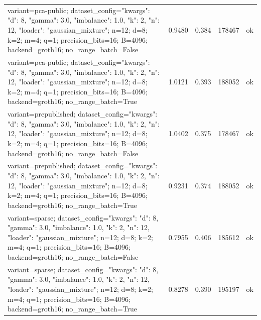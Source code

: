 \begin{tabular}{lcccc}
variant=pca-public; dataset\_config={"kwargs": {"d": 8, "gamma": 3.0, "imbalance": 1.0, "k": 2, "n": 12}, "loader": "gaussian\_mixture"}; n=12; d=8; k=2; m=4; q=1; precision\_bits=16; B=4096; backend=groth16; no\_range\_batch=False & 0.9480 & 0.384 & 178467 & ok \\
variant=pca-public; dataset\_config={"kwargs": {"d": 8, "gamma": 3.0, "imbalance": 1.0, "k": 2, "n": 12}, "loader": "gaussian\_mixture"}; n=12; d=8; k=2; m=4; q=1; precision\_bits=16; B=4096; backend=groth16; no\_range\_batch=True & 1.0121 & 0.393 & 188052 & ok \\
variant=prepublished; dataset\_config={"kwargs": {"d": 8, "gamma": 3.0, "imbalance": 1.0, "k": 2, "n": 12}, "loader": "gaussian\_mixture"}; n=12; d=8; k=2; m=4; q=1; precision\_bits=16; B=4096; backend=groth16; no\_range\_batch=False & 1.0402 & 0.375 & 178467 & ok \\
variant=prepublished; dataset\_config={"kwargs": {"d": 8, "gamma": 3.0, "imbalance": 1.0, "k": 2, "n": 12}, "loader": "gaussian\_mixture"}; n=12; d=8; k=2; m=4; q=1; precision\_bits=16; B=4096; backend=groth16; no\_range\_batch=True & 0.9231 & 0.374 & 188052 & ok \\
variant=sparse; dataset\_config={"kwargs": {"d": 8, "gamma": 3.0, "imbalance": 1.0, "k": 2, "n": 12}, "loader": "gaussian\_mixture"}; n=12; d=8; k=2; m=4; q=1; precision\_bits=16; B=4096; backend=groth16; no\_range\_batch=False & 0.7955 & 0.406 & 185612 & ok \\
variant=sparse; dataset\_config={"kwargs": {"d": 8, "gamma": 3.0, "imbalance": 1.0, "k": 2, "n": 12}, "loader": "gaussian\_mixture"}; n=12; d=8; k=2; m=4; q=1; precision\_bits=16; B=4096; backend=groth16; no\_range\_batch=True & 0.8278 & 0.390 & 195197 & ok \\
\bottomrule
\end{tabular}
